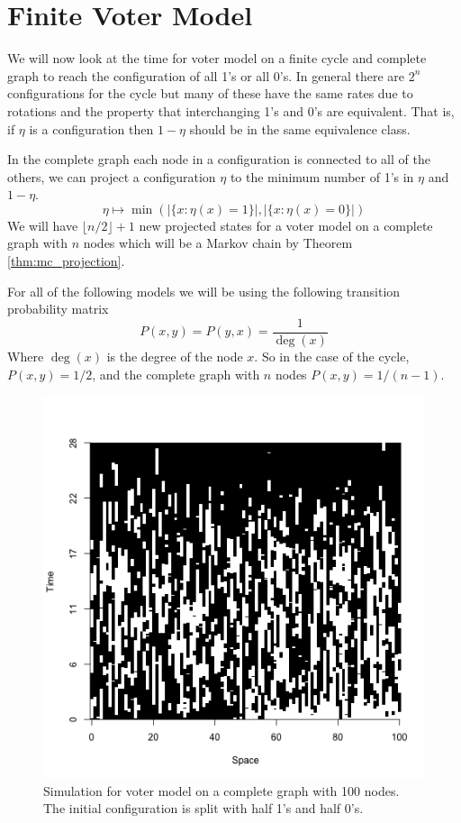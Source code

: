 \section{Finite Voter Model}
We will now look at the time for voter model on a finite cycle and complete graph to reach the configuration of all 1's or all 0's.
In general there are $2^n$ configurations for the cycle but many of these have the same rates due to rotations and the property that interchanging 1's and 0's are equivalent.
That is, if $\eta$ is a configuration then $1 - \eta$ should be in the same equivalence class.

In the complete graph each node in a configuration is connected to all of the others, we can project a configuration $\eta$ to the minimum number of 1's in $\eta$ and $1 - \eta$.
$$
\eta \mapsto \min\left(|\{x : \eta(x) = 1\}|, |\{x : \eta(x) = 0\}|  \right)
$$
We will have $\lfloor n/2 \rfloor + 1$ new projected states for a voter model on a complete graph with $n$ nodes which will be a Markov chain
by Theorem \ref{thm:mc_projection}.

For all of the following models we will be using the following transition probability matrix
$$
P(x,y) = P(y,x) = \frac{1}{\deg(x)}
$$
Where $\deg(x)$ is the degree of the node $x$.
So in the case of the cycle, $P(x,y) = 1/2$, and the complete graph with $n$ nodes $P(x,y) = 1/(n - 1)$.

\begin{figure}[H]
  \centering
    \includegraphics[width=.80\textwidth]{figures/voter_simulation_1d_complete_split_100.png}
   \caption{Simulation for voter model on a complete graph with 100 nodes. The initial configuration is split with half 1's and half 0's.}
  \label{fig:voter_sim_1d_complete.png}
\end{figure}

